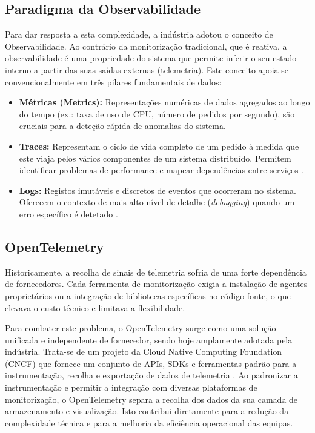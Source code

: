 \documentclass[a4paper,12pt,oneside]{article}
\begin{document}
    \subsection{Paradigma da Observabilidade}
        Para dar resposta a esta complexidade, a indústria adotou o conceito de Observabilidade. Ao contrário da monitorização tradicional, que é reativa, a observabilidade é uma propriedade do sistema que permite inferir o seu estado interno a partir das suas saídas externas (telemetria). Este conceito apoia-se convencionalmente em três pilares fundamentais de dados:

        \begin{itemize}
        \item \textbf{Métricas (Metrics):} Representações numéricas de dados agregados ao longo do tempo (ex.: taxa de uso de CPU, número de pedidos por segundo), são cruciais para a deteção rápida de anomalias do sistema.
        
        \item \textbf{Traces:} Representam o ciclo de vida completo de um pedido à medida que este viaja pelos vários componentes de um sistema distribuído. Permitem identificar problemas de performance e mapear dependências entre serviços \cite{jaeger_docs}.
        
        \item \textbf{Logs:} Registos imutáveis e discretos de eventos que ocorreram no sistema. Oferecem o contexto de mais alto nível de detalhe (\textit{debugging}) quando um erro específico é detetado \cite{otel_video}.
        \end{itemize}

    \subsection{OpenTelemetry}
        Historicamente, a recolha de sinais de telemetria sofria de uma forte dependência de fornecedores. Cada ferramenta de monitorização exigia a instalação de agentes proprietários ou a integração de bibliotecas específicas no código-fonte, o que elevava o custo técnico e limitava a flexibilidade.

        Para combater este problema, o OpenTelemetry surge como uma solução unificada e independente de fornecedor, sendo hoje amplamente adotada pela indústria. Trata-se de um projeto da Cloud Native Computing Foundation (CNCF) que fornece um conjunto de APIs, SDKs e ferramentas padrão para a instrumentação, recolha e exportação de dados de telemetria \cite{otel_docs}. Ao padronizar a instrumentação e permitir a integração com diversas plataformas de monitorização, o OpenTelemetry separa a recolha dos dados da sua camada de armazenamento e visualização. Isto contribui diretamente para a redução da complexidade técnica e para a melhoria da eficiência operacional das equipas.
\end{document}
